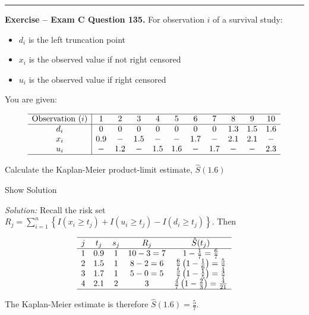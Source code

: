 \documentclass[]{book}
\providecommand{\tightlist}{%
  \setlength{\itemsep}{0pt}\setlength{\parskip}{0pt}}
\theoremstyle{definition}
\theoremstyle{definition}
\theoremstyle{definition}
\theoremstyle{remark}
\begin{document}
\begin{center}\rule{0.5\linewidth}{\linethickness}\end{center}

\textbf{Exercise -- Exam C Question 135.} For observation \(i\) of a
survival study:

\begin{itemize}
\tightlist
\item
  \(d_i\) is the left truncation point
\item
  \(x_i\) is the observed value if not right censored
\item
  \(u_i\) is the observed value if right censored
\end{itemize}

You are given:

\[\begin{array}{c|cccccccccc}
\hline
\text{Observation } (i) & 1 & 2 & 3 & 4 & 5 & 6 & 7 & 8 & 9 & 10\\ \hline
d_i & 0 & 0 & 0 & 0 & 0 & 0 & 0 & 1.3 & 1.5 & 1.6\\
x_i & 0.9 & - & 1.5 & - & - & 1.7 & - & 2.1 & 2.1 & - \\
u_i & - & 1.2 & - & 1.5 & 1.6 & - & 1.7 & - & - & 2.3 \\
\hline
\end{array}\]

Calculate the Kaplan-Meier product-limit estimate, \(\hat{S}(1.6)\)

Show Solution

\hypertarget{toggleExamC135}{}
\emph{Solution:} Recall the risk set
\(R_j = \sum_{i=1}^n \left\{ I(x_i \geq t_{j}) + I(u_i \geq t_{j}) - I(d_i \geq t_{j}) \right\}\).
Then

\[\begin{array}{ccccc}
\hline
j & t_j & s_j & R_j & \hat{S}(t_j) \\
\hline 
1  & 0.9   & 1   & 10-3 = 7 & 1-\frac{1}{7} = \frac{6}{7} \\
2  & 1.5   & 1   & 8-2 = 6  & \frac{6}{7}\left( 1 - \frac{1}{6} \right) = \frac{5}{7}\\
3  & 1.7   & 1   & 5-0 = 5  & \frac{5}{7}\left( 1 - \frac{1}{5} \right) = \frac{4}{7}\\
4  & 2.1   & 2   & 3        & \frac{4}{7}\left( 1 - \frac{2}{3}\right) = \frac{4}{21}\\
\hline
\end{array}\]

The Kaplan-Meier estimate is therefore \(\hat{S}(1.6) = \frac{5}{7}\).
\end{document}
